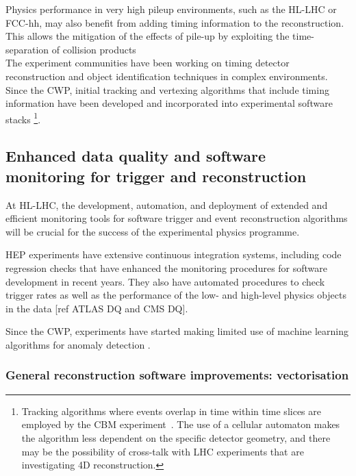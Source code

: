 Physics performance in very high pileup environments, such as the HL-LHC
or FCC-hh, may also benefit from adding timing information to the
reconstruction. This allows the mitigation of the effects of pile-up by
exploiting the time-separation of collision products~\cite{Collaboration:2623663,CMS:2667167}\\
The experiment communities have been working on timing detector
reconstruction and object identification techniques in complex
environments. Since the CWP, initial tracking and vertexing algorithms
that include timing information have been developed and incorporated
into experimental software stacks \cite{LindseyGreyMIPCTD}\footnote{Tracking algorithms where events overlap in time
within time slices are employed by the CBM experiment~\cite{Akishina:2015ghv,AkishinaThesis}. The use of a cellular automaton makes the
  algorithm less dependent on the specific detector geometry, and there
  may be the possibility of cross-talk with LHC experiments that are
  investigating 4D reconstruction.}.

\hypertarget{enhanced-data-quality-and-software-monitoring-for-trigger-and-reconstruction}{%
\subsection{Enhanced data quality and software monitoring for trigger
and
reconstruction}\label{enhanced-data-quality-and-software-monitoring-for-trigger-and-reconstruction}}

At HL-LHC, the development, automation, and deployment of extended and
efficient monitoring tools for software trigger and event reconstruction
algorithms will be crucial for the success of the experimental physics
programme.

HEP experiments have extensive continuous integration systems, including
code regression checks that have enhanced the monitoring procedures for
software development in recent years. They also have automated
procedures to check trigger rates as well as the performance of the low-
and high-level physics objects in the data {[}ref ATLAS DQ and CMS
DQ{]}.

Since the CWP, experiments have started making limited use of machine
learning algorithms for anomaly detection \cite{Adinolfi:2298467,CMSMonitoring}.

\hypertarget{general-reconstruction-software-improvements-vectorisation}{%
\subsubsection{General reconstruction software improvements:
vectorisation}\label{general-reconstruction-software-improvements-vectorization}}

